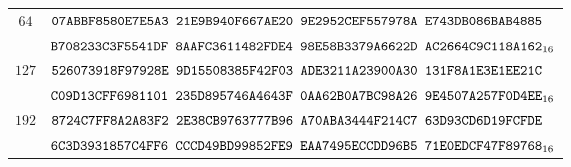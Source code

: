 \begin{table}[H]
\begin{tabular}{|c|l|}
\hline                                                                  
$64$ &                                                          
$\texttt{07ABBF8580E7E5A3~21E9B940F667AE20~9E2952CEF557978A~E743DB086BAB4885}$\\
&
$\texttt{B708233C3F5541DF~8AAFC3611482FDE4~98E58B3379A6622D~AC2664C9C118A162}_{16}$\\
\hline                                                                  
$127$ &                                                         
$\texttt{526073918F97928E~9D15508385F42F03~ADE3211A23900A30~131F8A1E3E1EE21C}$\\
&
$\texttt{C09D13CFF6981101~235D895746A4643F~0AA62B0A7BC98A26~9E4507A257F0D4EE}_{16}$\\
\hline                                                                  
$192$ &                                                         
$\texttt{8724C7FF8A2A83F2~2E38CB9763777B96~A70ABA3444F214C7~63D93CD6D19FCFDE}$\\
&
$\texttt{6C3D3931857C4FF6~CCCD49BD99852FE9~EAA7495ECCDD96B5~71E0EDCF47F89768}_{16}$\\
\hline
\end{tabular}
\end{table}

